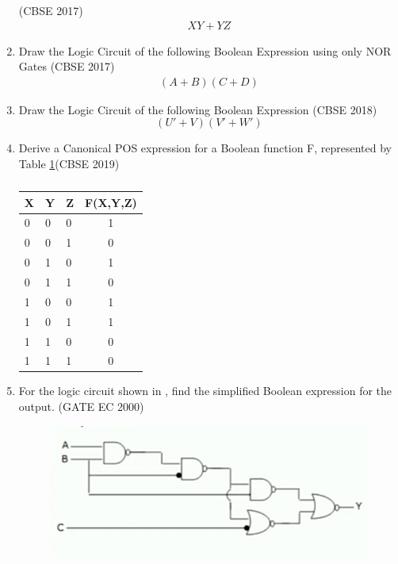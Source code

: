 \begin{enumerate}[label=\arabic*.,ref=\theenumi]
\hfill (CBSE 2017)
\label{prob:2017-1/c/6/b}
		\begin{align}
\label{eq:2017-1/c/6/b}
 XY + YZ
		\end{align}
\item Draw the Logic Circuit of the following Boolean Expression using only NOR Gates  
\hfill (CBSE 2017)
\label{prob:2017/c/6/b}
      \begin{align}
      (A+B)(C+D)
      \end{align}
\item Draw the Logic Circuit of the following Boolean Expression
\hfill (CBSE 2018)
\label{prob:2018/c/6/b}
\begin{equation} 
(U'+V)(V'+W')
\end{equation}
\item Derive a Canonical POS expression for a Boolean function F, represented by 
Table \ref{tab:2019/c/6/c}\hfill (CBSE 2019)
\label{prob:2019/c/6/c}
\begin{table}[H]
\centering
\begin{tabular}{|l|l|l|c|}
	\hline
	X&Y&Z&F(X,Y,Z)\\
	\hline
	0&0&0&1\\
	0&0&1&0\\
	0&1&0&1\\
	0&1&1&0\\
	1&0&0&1\\
	1&0&1&1\\
	1&1&0&0\\
	1&1&1&0\\
	\hline
\end{tabular}
\caption{}
\label{tab:2019/c/6/c}
\end{table}
\item For the logic circuit shown in , find the simplified Boolean expression for the output. 
\label{prob:2000/gate/ec/2/7}
\hfill (GATE EC 2000)
\begin{figure}[H]
    \centering
    \includegraphics[width=0.75\columnwidth]{figs/2000-gate-ec-2-7.jpg}
    \caption{}
\label{fig:2000/gate/ec/2/7}
\end{figure}

\end{enumerate}
